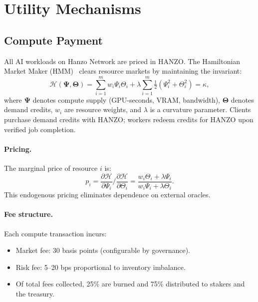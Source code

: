 \section{Utility Mechanisms}

\label{sec:utility}

\subsection{Compute Payment}
\label{sec:compute}

All AI workloads on Hanzo Network are priced in HANZO. The Hamiltonian Market
Maker (HMM)~\cite{hanzonetwork} clears resource markets by maintaining the
invariant:
\begin{equation}
\mathcal{H}(\bm{\Psi}, \bm{\Theta}) = \sum_{i=1}^{m} w_i \Psi_i \Theta_i +
\lambda \sum_{i=1}^{m} \tfrac{1}{2}(\Psi_i^2 + \Theta_i^2) = \kappa,
\end{equation}
where $\bm{\Psi}$ denotes compute supply (GPU-seconds, VRAM, bandwidth),
$\bm{\Theta}$ denotes demand credits, $w_i$ are resource weights, and $\lambda$
is a curvature parameter. Clients purchase demand credits with HANZO; workers
redeem credits for HANZO upon verified job completion.

\paragraph{Pricing.} The marginal price of resource $i$ is:
\begin{equation}
p_i = \frac{\partial \mathcal{H}}{\partial \Psi_i} \Big/
\frac{\partial \mathcal{H}}{\partial \Theta_i} =
\frac{w_i \Theta_i + \lambda \Psi_i}{w_i \Psi_i + \lambda \Theta_i}.
\end{equation}
This endogenous pricing eliminates dependence on external oracles.

\paragraph{Fee structure.} Each compute transaction incurs:
\begin{itemize}[leftmargin=1.1em]
    \item Market fee: 30 basis points (configurable by governance).
    \item Risk fee: 5--20 bps proportional to inventory imbalance.
    \item Of total fees collected, 25\% are burned and 75\% distributed to
    stakers and the treasury.
\end{itemize}

